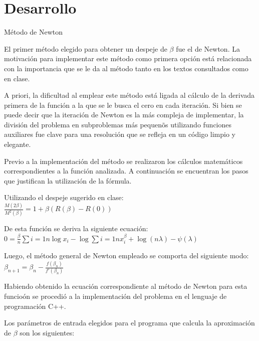 \section{Desarrollo}

\large{M\'etodo de Newton}

El primer m\'etodo elegido para obtener un despeje de $\beta$ fue el de Newton. La motivaci\'on para implementar este m\'etodo como primera opci\'on est\'a relacionada con la importancia que se le da al m\'etodo tanto en los textos consultados como en clase. 

A priori, la dificultad al emplear este m\'etodo est\'a ligada al c\'alculo de la derivada primera de la funci\'on a la que se le busca el cero en cada iteraci\'on. Si bien se puede decir que la iteraci\'on de Newton es la m\'as compleja de implementar, la divisi\'on del problema en subproblemas m\'as pequen\~os utilizando funciones auxiliares fue clave para una resoluci\'on que se refleja en un c\'odigo limpio y elegante.


Previo a la implementaci\'on del m\'etodo se realizaron los c\'alculos matem\'aticos correspondientes a la funci\'on analizada. A continuaci\'on se encuentran los pasos que justifican la utilizaci\'on de la f\'ormula.

Utilizando el despeje sugerido en clase:\\

$\frac{M(2\beta)}{M^2(\beta)}=1 + \beta(R(\beta)-R(0))$

De esta funci\'on se deriva la siguiente ecuaci\'on: \\

$0 = \frac{\beta}{n}\sum{i=1}{n}\log x_i - \log \sum{i=1}{n}x_i^{\beta} + \log(n\lambda)-\psi(\lambda)$

Luego, el m\'etodo general de Newton empleado se comporta del siguiente modo: \\

$\beta_{n+1} = \beta_{n} - \frac{f(\beta_{n})}{f'(\beta_{n})}$

Habiendo obtenido la ecuaci\'on correspondiente al m\'etodo de Newton para esta funcio\'on se procedi\'o a la implementaci\'on del problema en el lenguaje de programaci\'on C++.

Los par\'ametros de entrada elegidos para el programa que calcula la aproximaci\'on de $\beta$ son los siguientes:

